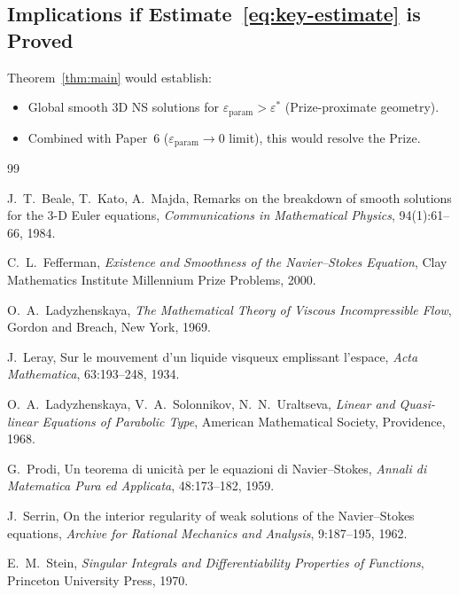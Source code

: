 \documentclass[11pt]{article}
\theoremstyle{definition}
\theoremstyle{remark}
\newcommand{\epsst}{\varepsilon^*}
\newcommand{\epsp}{\varepsilon_{\mathrm{param}}}
\begin{document}
\subsection{Implications if Estimate~\eqref{eq:key-estimate} is Proved}

Theorem~\ref{thm:main} would establish:
\begin{itemize}
\item Global smooth 3D NS solutions for $\epsp>\epsst$ (Prize-proximate geometry).
\item Combined with Paper~6 ($\epsp\to 0$ limit), this would resolve the Prize.
\end{itemize}

\begin{thebibliography}{99}

  J.~T.~Beale, T.~Kato, A.~Majda,
  Remarks on the breakdown of smooth solutions for the 3-D Euler equations,
  \emph{Communications in Mathematical Physics}, 94(1):61--66, 1984.

  C.~L.~Fefferman,
  \emph{Existence and Smoothness of the Navier--Stokes Equation},
  Clay Mathematics Institute Millennium Prize Problems, 2000.

  O.~A.~Ladyzhenskaya,
  \emph{The Mathematical Theory of Viscous Incompressible Flow},
  Gordon and Breach, New York, 1969.

  J.~Leray,
  Sur le mouvement d'un liquide visqueux emplissant l'espace,
  \emph{Acta Mathematica}, 63:193--248, 1934.

  O.~A.~Ladyzhenskaya, V.~A.~Solonnikov, N.~N.~Uraltseva,
  \emph{Linear and Quasi-linear Equations of Parabolic Type},
  American Mathematical Society, Providence, 1968.

  G.~Prodi,
  Un teorema di unicità per le equazioni di Navier--Stokes,
  \emph{Annali di Matematica Pura ed Applicata}, 48:173--182, 1959.

  J.~Serrin,
  On the interior regularity of weak solutions of the Navier--Stokes equations,
  \emph{Archive for Rational Mechanics and Analysis}, 9:187--195, 1962.

  E.~M.~Stein,
  \emph{Singular Integrals and Differentiability Properties of Functions},
  Princeton University Press, 1970.

\end{thebibliography}
\end{document}
